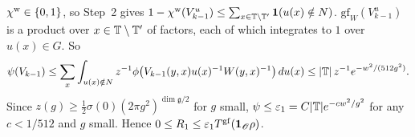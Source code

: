 \begin{detail}
\begin{step}
\end{step}
\begin{step}[Summation]
$\chi^{\rm w}\in\{0,1\}$, so Step~2 gives $1-\chi^{\rm w}(V_{k-1}^u)\le\sum_{x\in\mathbb T\setminus\mathbb T'}\mathbf 1(u(x)\notin N)$. $\mathrm{gf}_W(V_{k-1}^u)$ is a product over $x\in\mathbb T\setminus\mathbb T'$ of factors, each of which integrates to $1$ over $u(x)\in G$. So
\[
\psi(V_{k-1})\le\sum_{x}\int_{u(x)\notin N}z^{-1}\phi\big(V_{k-1}(y,x)u(x)^{-1}W(y,x)^{-1}\big)\,du(x)\le|\mathbb T|\,z^{-1}e^{-w^2/(512g^2)}.
\]
Since $z(g)\ge\frac12\sigma(0)(2\pi g^2)^{\dim\mathfrak g/2}$ for $g$ small, $\psi\le\varepsilon_1=C|\mathbb T|e^{-cw^2/g^2}$ for any $c<1/512$ and $g$ small. Hence $0\le R_1\le\varepsilon_1T^{\rm gf}(\mathbf 1_{\mathscr O}\rho)$.
\end{step}
\end{detail}

